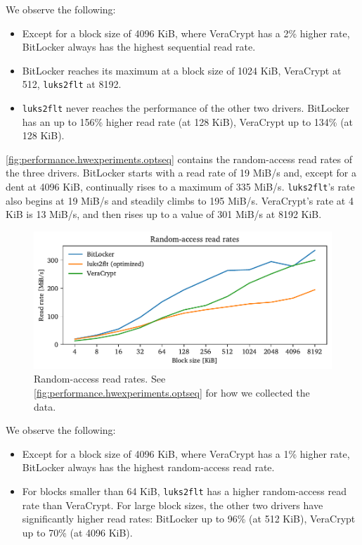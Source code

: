 We observe the following:
\begin{itemize}
	\item Except for a block size of 4096 KiB, where VeraCrypt has a 2\% higher rate, BitLocker always has the highest sequential read rate.
	\item BitLocker reaches its maximum at a block size of 1024 KiB, VeraCrypt at 512, \texttt{luks2flt} at 8192.
	\item \texttt{luks2flt} never reaches the performance of the other two drivers. BitLocker has an up to 156\% higher read rate (at 128 KiB), VeraCrypt up to 134\% (at 128 KiB).
\end{itemize}

\autoref{fig:performance.hwexperiments.optseq} contains the random-access read rates of the three drivers. BitLocker starts with a read rate of 19 MiB/s and, except for a dent at 4096 KiB, continually rises to a maximum of 335 MiB/s. \texttt{luks2flt}'s rate also begins at 19 MiB/s and steadily climbs to 195 MiB/s. VeraCrypt's rate at 4 KiB is 13 MiB/s, and then rises up to a value of 301 MiB/s at 8192 KiB. 

\begin{figure}[htb!]
	\center
	\includegraphics[scale=1]{../fig/performance.hwexperiments.optrand.pdf}
	\caption[
		Random-access read rates
	]{
		Random-access read rates. See \autoref{fig:performance.hwexperiments.optseq} for how we collected the data.
	}
	\label{fig:performance.hwexperiments.optrand}
\end{figure}

We observe the following:
\begin{itemize}
	\item Except for a block size of 4096 KiB, where VeraCrypt has a 1\% higher rate, BitLocker always has the highest random-access read rate.
	\item For blocks smaller than 64 KiB, \texttt{luks2flt} has a higher random-access read rate than VeraCrypt. For large block sizes, the other two drivers have significantly higher read rates: BitLocker up to 96\% (at 512 KiB), VeraCrypt up to 70\% (at 4096 KiB).
\end{itemize}

